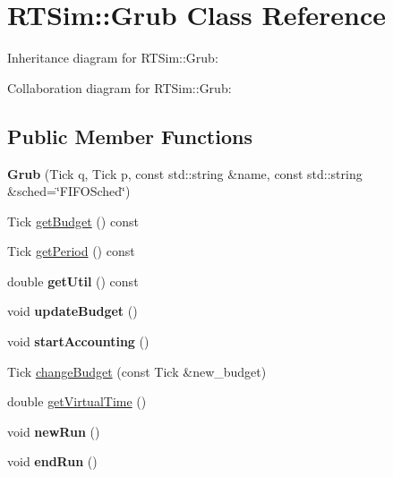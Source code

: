 \hypertarget{classRTSim_1_1Grub}{}\section{R\+T\+Sim\+:\+:Grub Class Reference}
\label{classRTSim_1_1Grub}


Inheritance diagram for R\+T\+Sim\+:\+:Grub\+:


Collaboration diagram for R\+T\+Sim\+:\+:Grub\+:
\subsection*{Public Member Functions}
\begin{DoxyCompactItemize}
\item 
{\bfseries Grub} (Tick q, Tick p, const std\+::string \&name, const std\+::string \&sched=\char`\"{}F\+I\+F\+O\+Sched\char`\"{})\hypertarget{classRTSim_1_1Grub_a3ca2163c4fcfb37cda87cd8cc596982d}{}\label{classRTSim_1_1Grub_a3ca2163c4fcfb37cda87cd8cc596982d}

\item 
Tick \hyperlink{classRTSim_1_1Grub_a7726aa2533b657098647778c834c1deb}{get\+Budget} () const 
\item 
Tick \hyperlink{classRTSim_1_1Grub_a9df03b12fe7f76f5c1e528685c6b028d}{get\+Period} () const 
\item 
double {\bfseries get\+Util} () const \hypertarget{classRTSim_1_1Grub_a64d6a34365e26c39cb6c700d342efab7}{}\label{classRTSim_1_1Grub_a64d6a34365e26c39cb6c700d342efab7}

\item 
void {\bfseries update\+Budget} ()\hypertarget{classRTSim_1_1Grub_a1cd5f5d31fcc1f01ae79e38239b563ec}{}\label{classRTSim_1_1Grub_a1cd5f5d31fcc1f01ae79e38239b563ec}

\item 
void {\bfseries start\+Accounting} ()\hypertarget{classRTSim_1_1Grub_a8ec9562a109ca2fc224c0bf0e8f0e667}{}\label{classRTSim_1_1Grub_a8ec9562a109ca2fc224c0bf0e8f0e667}

\item 
Tick \hyperlink{classRTSim_1_1Grub_a14bf773d53e68b2eefe2cf6ebc35cabf}{change\+Budget} (const Tick \&new\+\_\+budget)
\item 
double \hyperlink{classRTSim_1_1Grub_a622e2015714f9ab5607cbac997b7be73}{get\+Virtual\+Time} ()
\item 
void {\bfseries new\+Run} ()\hypertarget{classRTSim_1_1Grub_a2d0f213039bba4be3b6da16969987d63}{}\label{classRTSim_1_1Grub_a2d0f213039bba4be3b6da16969987d63}

\item 
void {\bfseries end\+Run} ()\hypertarget{classRTSim_1_1Grub_ae5b91d663d12db4863fa6bee933957b5}{}\label{classRTSim_1_1Grub_ae5b91d663d12db4863fa6bee933957b5}

\end{DoxyCompactItemize}
